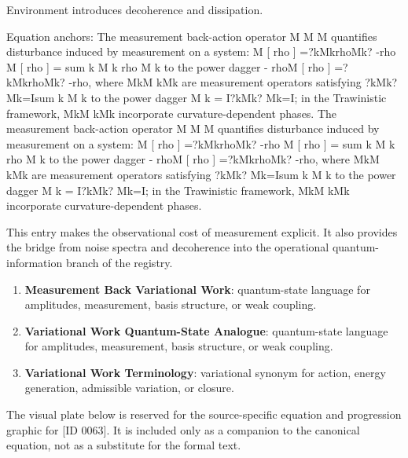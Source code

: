 Environment introduces decoherence and dissipation.

Equation anchors: The measurement back-action operator M M M quantifies disturbance induced by measurement on a system: M [ rho ] =?kMkrhoMk? -rho M [ rho ] = sum k M k rho M k to the power dagger - rhoM [ rho ] =?kMkrhoMk? -rho, where MkM kMk are measurement operators satisfying ?kMk? Mk=Isum k M k to the power dagger M k = I?kMk? Mk=I; in the Trawinistic framework, MkM kMk incorporate curvature-dependent phases. The measurement back-action operator M M M quantifies disturbance induced by measurement on a system: M [ rho ] =?kMkrhoMk? -rho M [ rho ] = sum k M k rho M k to the power dagger - rhoM [ rho ] =?kMkrhoMk? -rho, where MkM kMk are measurement operators satisfying ?kMk? Mk=Isum k M k to the power dagger M k = I?kMk? Mk=I; in the Trawinistic framework, MkM kMk incorporate curvature-dependent phases.

This entry makes the observational cost of measurement explicit. It also provides the bridge from noise spectra and decoherence into the operational quantum-information branch of the registry.
\endgroup

\begingroup\footnotesize\sloppy
\begin{enumerate}[leftmargin=1.35em,itemsep=1pt,topsep=1pt,parsep=0pt]
\item \textbf{Measurement Back Variational Work}: quantum-state language for amplitudes, measurement, basis structure, or weak coupling.
\item \textbf{Variational Work Quantum-State Analogue}: quantum-state language for amplitudes, measurement, basis structure, or weak coupling.
\item \textbf{Variational Work Terminology}: variational synonym for action, energy generation, admissible variation, or closure.
\end{enumerate}
\endgroup

\begingroup\footnotesize\sloppy
The visual plate below is reserved for the source-specific equation and progression graphic for [ID 0063]. It is included only as a companion to the canonical equation, not as a substitute for the formal text.
\par\endgroup
\ifTZPDarkEdition
{}
\fi

